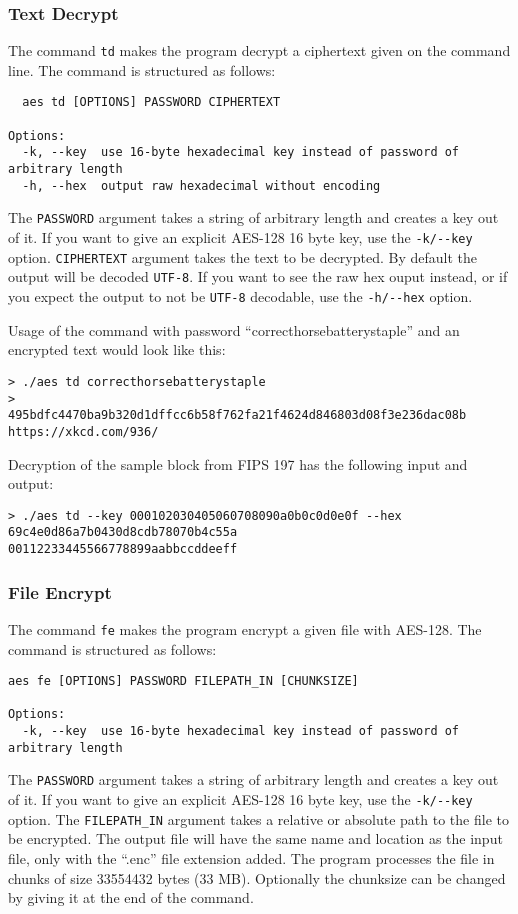 \subsubsection{Text Decrypt}
The command \lstinline{td} makes the program decrypt a ciphertext given on the command line. The command is structured as follows:
\begin{lstlisting}
  aes td [OPTIONS] PASSWORD CIPHERTEXT

Options:
  -k, --key  use 16-byte hexadecimal key instead of password of arbitrary length
  -h, --hex  output raw hexadecimal without encoding
\end{lstlisting}
The \lstinline{PASSWORD} argument takes a string of arbitrary length and creates a key out of it. If you want to give an explicit AES-128 16 byte key, use the \lstinline{-k/--key} option. \lstinline{CIPHERTEXT} argument takes the text to be decrypted. By default the output will be decoded \lstinline{UTF-8}. If you want to see the raw hex ouput instead, or if you expect the output to not be \lstinline{UTF-8} decodable, use the \lstinline{-h/--hex} option.

Usage of the command with password \enquote{correcthorsebatterystaple} and an encrypted text would look like this:
\begin{lstlisting}
> ./aes td correcthorsebatterystaple
>      495bdfc4470ba9b320d1dffcc6b58f762fa21f4624d846803d08f3e236dac08b
https://xkcd.com/936/
\end{lstlisting}

Decryption of the sample block from FIPS 197 \cite{aes2001} has the following input and output:
\begin{lstlisting}
> ./aes td --key 000102030405060708090a0b0c0d0e0f --hex 69c4e0d86a7b0430d8cdb78070b4c55a
00112233445566778899aabbccddeeff
\end{lstlisting}


\subsubsection{File Encrypt}
The command \lstinline{fe} makes the program encrypt a given file with AES-128. The command is structured as follows:
\begin{lstlisting}
aes fe [OPTIONS] PASSWORD FILEPATH_IN [CHUNKSIZE]

Options:
  -k, --key  use 16-byte hexadecimal key instead of password of arbitrary length
\end{lstlisting}
The \lstinline{PASSWORD} argument takes a string of arbitrary length and creates a key out of it. If you want to give an explicit AES-128 16 byte key, use the \lstinline{-k/--key} option. The \lstinline{FILEPATH_IN} argument takes a relative or absolute path to the file to be encrypted. The output file will have the same name and location as the input file, only with the \enquote{.enc} file extension added. The program processes the file in chunks of size 33554432 bytes (33 MB). Optionally the chunksize can be changed by giving it at the end of the command.

